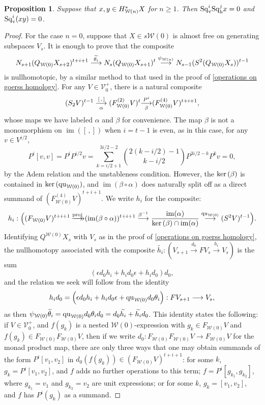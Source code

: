 \documentclass[11pt]{amsart}
\theoremstyle{plain}
\newtheorem{prop}[thm]{Proposition}
\theoremstyle{definition}
\renewcommand{\ker}{\textup{ker}\,}
\DeclareMathOperator{\im}{im}
\renewcommand{\to}{\longrightarrow}
\newcommand{\calW}{\mathcal{W}}
\newcommand{\calV}{\mathcal{V}}
\newcommand{\calw}{\mathcal{W}}
\theoremstyle{plain}
\newcommand{\vect}[2]{\calV^{#1}_{#2}}
\newcommand{\quadratic}{\textup{qu}}
\newcommand{\epi}{{\,\makebox[0cm][l]{\ensuremath\to}\to}}
\newcommand{\mono}{{\to}}
\newcommand{\Sqh}{\mathrm{Sq}_\textup{h}}
\newcommand{\Sqv}{\mathrm{Sq}_\textup{v}}
\newcommand{\deltav}{\delta^\textup{v}}
\begin{document}
\begin{Cohomology Operations for W and U}
\begin{prop}
Suppose that $x,y\in H^*_{\smash{\calW(n)}}X$ for $n\geq1$. Then $\Sqv^{i}\Sqh^{j}x=0$ and $\Sqv^i(xy)=0$.
\end{prop}
\begin{proof}
For the case $n=0$, suppose that $X\in s\calw(0)$ is almost free on generating subspaces $V_s$. It is enough to prove that the composite
\[N_{s+1}(Q_{\calW(0)}X_{s+2})^{t+i+1}
\overset{\smash{\widetilde{\theta_i}}}{\to}
N_s(Q_{\calW(0)}X_{s+1})^{t}
\overset{{\psi_{\calw(n)}}}{\to}
N_{s-1}(S^2(Q_{\calW(0)}X_{s}))^{t-1}
\]
is nullhomotopic, by a similar method to that used in the proof of \ref{operations on goerss homology}. For any $V\in \vect{+}{0}$, there is a natural composite
\[(S_2V)^{t-1}\underset{\smash{\alpha}}{\overset{[\,,\,]}{\to}} (F^{(2)}_{\calW(0)}V)^{t}\underset{\smash{\beta}}{\overset{P^i}{\mono}} (F^{(4)}_{\calW(0)}V)^{t+i+1},\]
whose maps we have labeled $\alpha$ and $\beta$ for convenience.
The map $\beta$ is not a monomorphism on $\im([\,,])$ when $i=t-1$ is even, as in this case, for any $v\in V^{i/2}$,
\[P^i[v,v]=P^{i}P^{i/2}v=\textstyle\sum_{k=i/2+1}^{3i/2-2}{2(k-i/2)-1\choose k-i/2}P^{3i/2-k}P^kv=0,\]
by the Adem relation and the unstableness condition. However, the $\ker(\beta)$ is contained in $\ker(\quadratic_{\calw(0)})$, 
and $\im(\beta\circ\alpha)$ does naturally split off as a direct summand of $(F^{(4)}_{\calW(0)}V)^{t+i+1}$.
 We write $h_i$ for the composite:
\[h_{i}:\Bigl((F_{\calW(0)}V)^{t+i+1}\overset{\textup{proj}}{\epi}
(\im(\beta\circ\alpha))^{t+i+1}\overset{\beta^{-1}}{\to}\frac{\im(\alpha)}{\ker(\beta)\cap\im(\alpha)}\overset{\quadratic_{\calw(0)}}{\to}(S^2V)^{t-1}\Bigr).\]
Identifying $Q^{\calW(0)}X_s$ with $V_s$ as in the proof of \ref{operations on goerss homology}, the nullhomotopy associated with the composite $\widetilde{h_i}:(V_{s+1}\overset{d_0}{\to}FV_s\overset{h_i}{\to}V_s)$ is the sum
\[(\epsilon d_0h_i+h_id_0\epsilon+h_id_0)d_0,\]
and the relation we seek will follow from the identity
\[h_id_0=\Bigl(\epsilon d_0h_i+h_id_0\epsilon+\quadratic_{\calw(0)} d_0\theta_i\Bigr):FV_{s+1}\to V_s,\]
as then $\psi_{\calw(0)}\smash{\widetilde{\theta}_i}=\quadratic_{\calw(0)} d_0\theta_id_0=d_0\widetilde{h_i}+\widetilde{h_i}d_0$. This identity states the following: if $V\in\vect{+}{0}$, and $f(g_k)$ is a nested $\calw(0)$-expression with $g_k\in F_{\calw(0)}V$ and $f(g_k)\in F_{\calw(0)}F_{\calw(0)}V$, then if we write $d_0:F_{\calw(0)}F_{\calw(0)}V\to F_{\calw(0)}V$ for the monad product map, there are only three ways that one may obtain summands of the form $P^i[v_1,v_2]$ in $d_0(f(g_k))\in (F_{\calw(0)}V)^{t+i+1}$: for some $k$, $g_k=P^i[v_1,v_2]$, and $f $ adds no further operations to this term; $f=P^i[g_{k_1},g_{k_2}]$, where $g_{k_1}=v_1$ and $g_{k_2}=v_2$ are unit expressions; or for some $k$, $g_k=[v_1,v_2]$, and  $f$ has $P^i(g_k)$ as a summand.


\end{proof}
\end{Cohomology Operations for W and U}
\end{document}
